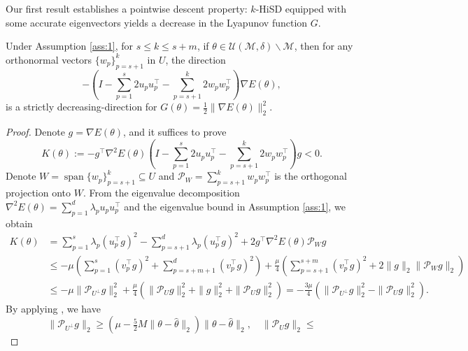 \documentclass[final]{siamart251216}
\begin{document}
Our first result establishes a pointwise descent property: $k$-HiSD equipped with some accurate eigenvectors yields a decrease in the Lyapunov function $G$.
\begin{theorem}\label{thm:direction}
Under Assumption \ref{ass:1}, for $s\leqslant k\leqslant s+m$, if $\theta \in \mathcal{U}(\mathcal{M},\delta) \backslash \mathcal{M}$, then 
for any orthonormal vectors $\{w_p\}_{p=s+1}^{k}$ in $U$,
the direction 
\begin{equation}
    -\left(I-\sum_{p=1}^s 2 u_p u_p^\top
    -\sum_{p=s+1}^k 2 w_p w_p^\top
    \right) \nabla E(\theta),
\end{equation}
is a strictly decreasing-direction for $G(\theta)=\frac{1}{2}\|\nabla E(\theta)\|_2^2$.
\end{theorem}
\begin{proof}
Denote $g = \nabla E(\theta)$, and it suffices to prove
\begin{equation}\label{eqn:ktheta}
K(\theta):=-g^{\top}\nabla^{2}E(\theta)\left(I-\sum_{p=1}^s 2u_p u_p^\top -\sum_{p=s+1}^k 2w_p w_p^\top \right) g< 0.
\end{equation}
Denote $W=\operatorname{span}\{w_p\}_{p=s+1}^{k}\subseteq U$ and $\mathcal{P}_{W}=\sum_{p=s+1}^k w_p w_p^\top$ is the orthogonal projection onto $W$.
From the eigenvalue decomposition $\nabla^2 E(\theta) = \sum_{p=1}^{d} \lambda_p u_p u_p^\top$ and the eigenvalue bound in Assumption \ref{ass:1}, we obtain
\begin{equation*}
\begin{aligned}
K(\theta) 
&=\sum_{p=1}^{s}\lambda_{p}(u_{p}^{\top}g)^2-
\sum_{p=s+1}^{d}\lambda_{p}(u_{p}^{\top}g)^2
+2g^{\top}\nabla^{2}E(\theta)\mathcal{P}_{W}g \\
&\leqslant -\mu 
\left(\sum_{p=1}^{s}(v_{p}^{\top} g)^2
+\sum_{p=s+m+1}^{d}(v_{p}^{\top}g)^2\right)+
\frac{\mu}{4}\left(\sum_{p=s+1}^{s+m}(v_{p}^{\top}g)^2+
2 \|g\|_2\|\mathcal{P}_{W}g\|_2 \right)\\
&\leqslant -\mu \|\mathcal{P}_{U^\perp}g\|_2^2
+ \frac{\mu}{4}
\left(\|\mathcal{P}_{U}g\|_2^2+
\|g\|_2^2 + \|\mathcal{P}_{U}g\|_2^2 \right)
= -\frac{3\mu}{4}
\left(\|\mathcal{P}_{U^\perp}g\|_2^2 
- \|\mathcal{P}_{U}g\|_2^2\right).
\end{aligned}
\end{equation*}
By applying , we have
\begin{equation}
\|\mathcal{P}_{U^\perp}g\|_2 \geqslant
\left(\mu-\tfrac{5}{2}M\|\theta-\hat\theta\|_2\right)
\|\theta-\hat\theta\|_2,
\quad
\|\mathcal{P}_{U}g\|_2 \leqslant

\end{equation}
\end{proof}
\end{document}
